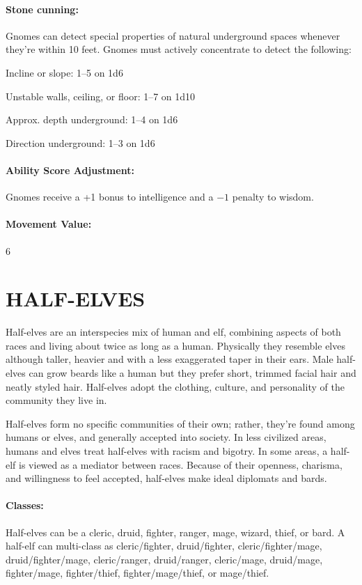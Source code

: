 \begin{multicols}{2}
\paragraph{Stone cunning:} Gnomes can detect special properties of natural underground spaces whenever they're within 10 feet.  Gnomes must actively concentrate to detect the following:

Incline or slope: 1--5 on 1d6

Unstable walls, ceiling, or floor: 1--7 on 1d10

Approx. depth underground: 1--4 on 1d6

Direction underground: 1--3 on 1d6

\paragraph{Ability Score Adjustment:} Gnomes receive a +1 bonus to intelligence and a $-1$ penalty to wisdom.

\paragraph{Movement Value:} 6

\section{HALF-ELVES}

Half-elves are an interspecies mix of human and elf, combining aspects of both races and living about twice as long as a human.  Physically they resemble elves although taller, heavier and with a less exaggerated taper in their ears.  Male half-elves can grow beards like a human but they prefer short, trimmed facial hair and neatly styled hair.  Half-elves adopt the clothing, culture, and personality of the community they live in.

Half-elves form no specific communities of their own; rather, they're found among humans or elves, and generally accepted into society.  In less civilized areas, humans and elves treat half-elves with racism and bigotry.  In some areas, a half-elf is viewed as a mediator between races.  Because of their openness, charisma, and willingness to feel accepted, half-elves make ideal diplomats and bards.

\paragraph{Classes:} Half-elves can be a cleric, druid, fighter, ranger, mage, wizard, thief, or bard.  A half-elf can multi-class as cleric/fighter, druid/fighter, cleric/fighter/mage, druid/fighter/mage, cleric/ranger, druid/ranger, cleric/mage, druid/mage, fighter/mage, fighter/thief, fighter/mage/thief, or mage/thief.  


\end{multicols}

